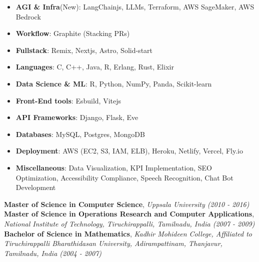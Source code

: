 \newpage
\begin{minipage}[t]{0.29\textwidth} %

\colorbox{cvblue!90}
{\color{white}  %
  \textwidth\relax %
  \begin{minipage}[t][293mm][t]{0.82\textwidth}
  \raggedright
  \vspace*{2.5ex}

  \Large
  \begin{itemize}
      \item \textbf{AGI \& Infra}(New): LangChainjs, LLMs, Terraform, AWS SageMaker, AWS Bedrock
      \item \textbf{Workflow}: Graphite (Stacking PRs)
      \item \textbf{Fullstack}: Remix, Nextjs, Astro, Solid-start
      \item \textbf{Languages}: C, C++, Java, R, Erlang, Rust, Elixir
      \item \textbf{Data Science \& ML}: R, Python, NumPy, Panda, Scikit-learn
      \item \textbf{Front-End tools}: Esbuild, Vitejs
      \item \textbf{API Frameworks}: Django, Flask, Eve
      \item \textbf{Databases}: MySQL, Postgres, MongoDB
      \item \textbf{Deployment}: AWS (EC2, S3, IAM, ELB), Heroku, Netlify, Vercel, Fly.io
      \item \textbf{Miscellaneous}: Data Visualization, KPI Implementation, SEO Optimization, Accessibility Compliance, Speech Recognition, Chat Bot Development
  \end{itemize}

  \Large
  \Large
  \textbf{Master of Science in Computer Science}, \textit{Uppsala University (2010 - 2016)}\\
  \vspace{0.5em}
  \textbf{Master of Science in Operations Research and Computer Applications}, \textit{National Institute of Technology, Tiruchirappalli, Tamilnadu, India (2007 - 2009)}\\
  \vspace{0.5em}
  \textbf{Bachelor of Science in Mathematics}, \textit{Kadhir Mohideen College, Affiliated to Tiruchirappalli Bharathidasan University, Adirampattinam, Thanjavur, Tamilnadu, India (2004 - 2007)}\\


\end{minipage}}
\end{minipage}
